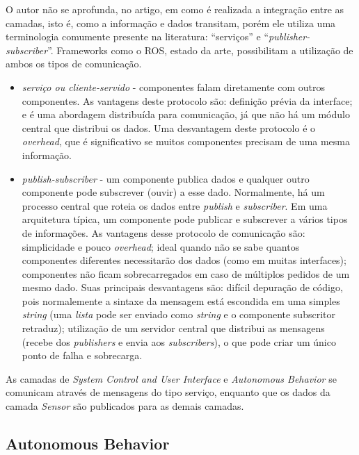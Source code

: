O autor não se aprofunda, no artigo, em como é realizada a integração entre as
camadas, isto é, como a informação e dados transitam, porém ele utiliza
uma terminologia comumente presente na literatura: ``serviços'' e
``\textit{publisher-subscriber}''. Frameworks como o ROS, estado da arte,
possibilitam a utilização de ambos os tipos de comunicação.

\begin{itemize}
  \item \textit{serviço ou cliente-servido} -  componentes falam diretamente
  com outros componentes. As vantagens deste protocolo são: definição prévia da
  interface; e é uma abordagem distribuída para comunicação, já que não há um
  módulo central que distribui os dados. Uma desvantagem deste protocolo é o
  \textit{overhead}, que é significativo se muitos componentes precisam de uma
  mesma informação.
  
  \item \textit{publish-subscriber} - um componente publica dados e qualquer outro componente
pode subscrever (ouvir) a esse dado. Normalmente, há um processo central que
roteia os dados entre \textit{publish} e \textit{subscriber}. Em uma arquitetura
típica, um componente pode publicar e subscrever a vários tipos de informações.
As vantagens desse protocolo de comunicação são: simplicidade e pouco
\textit{overhead}; ideal quando não se sabe quantos componentes diferentes
necessitarão dos dados (como em muitas interfaces); componentes não ficam
sobrecarregados em caso de múltiplos pedidos de um mesmo dado. Suas principais
desvantagens são: difícil depuração de código, pois normalemente a sintaxe da
mensagem está escondida em uma simples \textit{string} (uma \textit{lista}
pode ser enviado como \textit{string} e o componente subscritor retraduz);
utilização de um servidor central que distribui as mensagens (recebe dos
\textit{publishers} e envia aos \textit{subscribers}), o que pode criar um único
ponto de falha e sobrecarga.
   
\end{itemize}

As camadas de \textit{System Control and User Interface} e \textit{Autonomous
Behavior} se comunicam através de mensagens do tipo serviço, enquanto que os
dados da camada \textit{Sensor} são publicados para as demais camadas.

\subsection{Autonomous Behavior}
